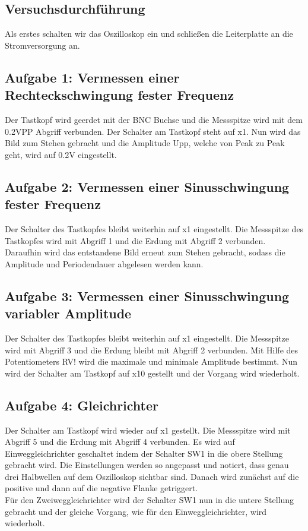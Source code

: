 \subsection{Versuchsdurchführung}
Als erstes schalten wir das Oszilloskop ein und schließen die Leiterplatte an die Stromversorgung an.\\
\subsection*{Aufgabe 1: Vermessen einer Rechteckschwingung fester Frequenz}
Der Tastkopf wird geerdet mit der BNC Buchse und die Messspitze wird mit dem 0.2VPP Abgriff verbunden. Der Schalter am Tastkopf steht auf x1. Nun wird das Bild zum Stehen gebracht und die Amplitude Upp, welche von Peak zu Peak geht, wird auf 0.2V eingestellt.\\
\subsection*{Aufgabe 2: Vermessen einer Sinusschwingung fester Frequenz}
Der Schalter des Tastkopfes bleibt weiterhin auf x1 eingestellt. Die Messspitze des Tastkopfes wird mit Abgriff 1 und die Erdung mit Abgriff 2 verbunden. Daraufhin wird das entstandene Bild erneut zum Stehen gebracht, sodass die Amplitude und Periodendauer abgelesen werden kann.\\
\subsection*{Aufgabe 3: Vermessen einer Sinusschwingung variabler Amplitude}
Der Schalter des Tastkopfes bleibt weiterhin auf x1 eingestellt. Die Messspitze wird mit Abgriff 3 und die Erdung bleibt mit Abgriff 2 verbunden. Mit Hilfe des Potentiometers RV! wird die maximale und minimale Amplitude bestimmt. Nun wird der Schalter am Tastkopf auf x10 gestellt und der Vorgang wird wiederholt.\\
\subsection*{Aufgabe 4: Gleichrichter}
Der Schalter am Tastkopf wird wieder auf x1 gestellt. Die Messspitze wird mit Abgriff 5 und die Erdung mit Abgriff 4 verbunden. Es wird auf Einweggleichrichter geschaltet indem der Schalter SW1 in die obere Stellung gebracht wird. Die Einstellungen werden so angepasst und notiert, dass genau drei Halbwellen auf dem Oszilloskop sichtbar sind. Danach wird zunächst auf die positive und dann auf die negative Flanke getriggert.\\
Für den Zweiweggleichrichter wird der Schalter SW1 nun in die untere Stellung gebracht und der gleiche Vorgang, wie für den Einweggleichrichter, wird wiederholt.\\
